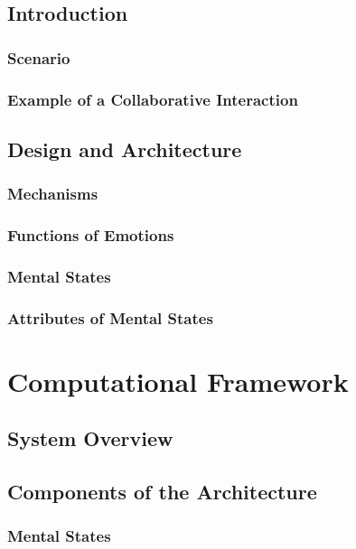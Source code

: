 \documentclass[12pt]{report}
\begin{document}
\section{Introduction}

\subsection{Scenario}

\subsection{Example of a Collaborative Interaction}

\section{Design and Architecture}

\subsection{Mechanisms}

\subsection{Functions of Emotions}

\subsection{Mental States}

\subsection{Attributes of Mental States}

\chapter{Computational Framework}
\label{ch:framework}

\section{System Overview}

\section{Components of the Architecture}

\subsection{Mental States}
\end{document}
